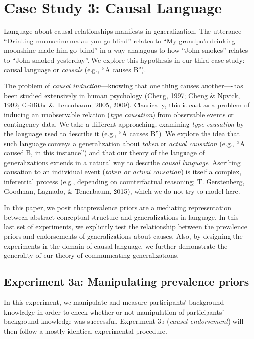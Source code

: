 \documentclass[english,floatsintext,man]{apa6}
\theoremstyle{definition}
\theoremstyle{definition}
\theoremstyle{definition}
\theoremstyle{remark}
\begin{document}
\section{Case Study 3: Causal
Language}\label{case-study-3-causal-language}

Language about causal relationships manifests in generalization. The
utterance \enquote{Drinking moonshine makes you go blind} relates to
\enquote{My grandpa's drinking moonshine made him go blind} in a way
analagous to how \enquote{John smokes} relates to \enquote{John smoked
yesterday}. We explore this hypothesis in our third case study: causal
language or \emph{causals} (e.g., \enquote{A causes B}).

The problem of \emph{causal induction}---knowing that one thing causes
another----has been studied extensively in human psychology (Cheng,
1997; Cheng \& Npvick, 1992; Griffiths \& Tenenbaum, 2005, 2009).
Classically, this is cast as a problem of inducing an unobservable
relation (\emph{type causation}) from observable events or contingency
data. We take a different approaching, examining \emph{type causation}
by the language used to describe it (e.g., \enquote{A causes B}). We
explore the idea that such language conveys a generalization about \emph{token} or
\emph{actual causation} (e.g., \enquote{A caused B, in this instance})
and that our theory of the language of generalizations extends in a
natural way to describe \emph{causal language}. Ascribing causation to
an individual event (\emph{token or actual causation}) is itself a
complex, inferential process (e.g., depending on counterfactual
reasoning; T. Gerstenberg, Goodman, Lagnado, \& Tenenbaum, 2015), which
we do not try to model here.

In this paper, we posit thatprevalence priors are a mediating
representation between abstract conceptual structure and generalizations
in language. In this last set of experiments, we explicitly test the
relationship between the prevalence priors and endorsements of
generalizations about causes. Also, by designing the experiments in the
domain of causal language, we further demonstrate the generality of our
theory of communicating generalizations.

\subsection{Experiment 3a: Manipulating prevalence
priors}\label{experiment-3a-manipulating-prevalence-priors}

In this experiment, we manipulate and measure participants' background
knowledge in order to check whether or not manipulation of participants'
background knowledge was successful. Experiment 3b (\emph{causal
endorsement}) will then follow a mostly-identical experimental
procedure.
\end{document}
